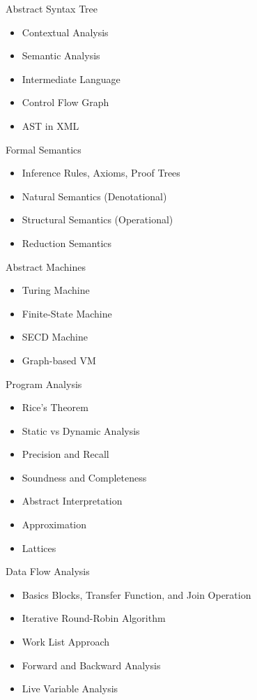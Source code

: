 \documentclass[nobrand,anonymous,nodate,nosecurity]{huawei}
\begin{document}
{\begin{lectures}
\begin{itemize}
	\end{itemize}
\item Abstract Syntax Tree
	\begin{itemize}
	\item Contextual Analysis
	\item Semantic Analysis
	\item Intermediate Language
	\item Control Flow Graph
	\item AST in XML
	\end{itemize}
\item Formal Semantics
	\begin{itemize}
	\item Inference Rules, Axioms, Proof Trees
	\item Natural Semantics (Denotational)
	\item Structural Semantics (Operational)
	\item Reduction Semantics
	\end{itemize}
\item Abstract Machines
	\begin{itemize}
	\item Turing Machine
	\item Finite-State Machine
	\item SECD Machine
	\item Graph-based VM
	\end{itemize}
\item Program Analysis
	\begin{itemize}
	\item Rice's Theorem
	\item Static vs Dynamic Analysis
	\item Precision and Recall
	\item Soundness and Completeness
	\item Abstract Interpretation
	\item Approximation
	\item Lattices
	\end{itemize}
\item Data Flow Analysis
	\begin{itemize}
	\item Basics Blocks, Transfer Function, and Join Operation
	\item Iterative Round-Robin Algorithm
	\item Work List Approach
	\item Forward and Backward Analysis
	\item Live Variable Analysis

\end{itemize}
\end{lectures}}
\end{document}
